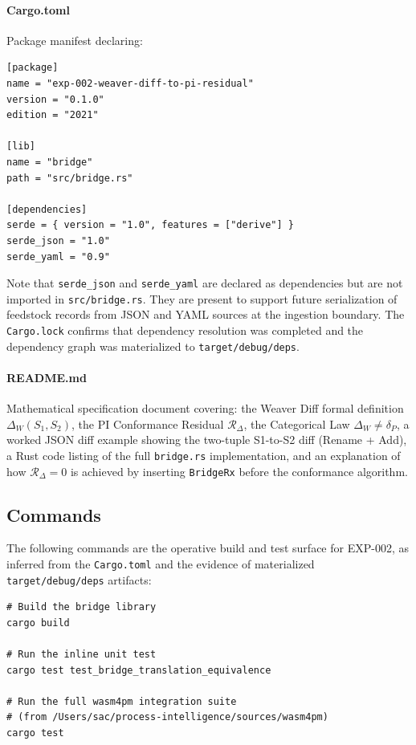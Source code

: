 \paragraph{Cargo.toml}
Package manifest declaring:
\begin{verbatim}
[package]
name = "exp-002-weaver-diff-to-pi-residual"
version = "0.1.0"
edition = "2021"

[lib]
name = "bridge"
path = "src/bridge.rs"

[dependencies]
serde = { version = "1.0", features = ["derive"] }
serde_json = "1.0"
serde_yaml = "0.9"
\end{verbatim}

Note that \texttt{serde\_json} and \texttt{serde\_yaml} are declared as
dependencies but are not imported in \texttt{src/bridge.rs}. They are present to
support future serialization of feedstock records from JSON and YAML sources at the
ingestion boundary. The \texttt{Cargo.lock} confirms that dependency resolution
was completed and the dependency graph was materialized to
\texttt{target/debug/deps}.

\paragraph{README.md}
Mathematical specification document covering: the Weaver Diff formal definition
$\Delta_W(S_1, S_2)$, the PI Conformance Residual $\mathcal{R}_{\Delta}$, the
Categorical Law $\Delta_W \neq \delta_P$, a worked JSON diff example showing the
two-tuple S1-to-S2 diff (Rename + Add), a Rust code listing of the full
\texttt{bridge.rs} implementation, and an explanation of how $\mathcal{R}_{\Delta} = 0$
is achieved by inserting \texttt{BridgeRx} before the conformance algorithm.

\subsection{Commands}
\label{sec:otel-weaver-exp-002-diff-to-residual-impl-commands}

The following commands are the operative build and test surface for EXP-002,
as inferred from the \texttt{Cargo.toml} and the evidence of materialized
\texttt{target/debug/deps} artifacts:

\begin{verbatim}
# Build the bridge library
cargo build

# Run the inline unit test
cargo test test_bridge_translation_equivalence

# Run the full wasm4pm integration suite
# (from /Users/sac/process-intelligence/sources/wasm4pm)
cargo test
\end{verbatim}

